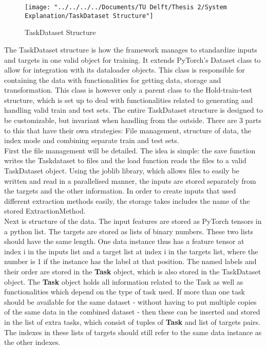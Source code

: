 \begin{figure}
	\centering
	\texttt{[image: "../../../../Documents/TU Delft/Thesis 2/System Explanation/TaskDataset Structure"]}
	\caption[TaskDataset Structure]{TaskDataset Structure}
	\label{fig:taskdataset-structure}
\end{figure}

The TaskDataset structure is how the framework manages to standardize inputs and targets in one valid object for training. It extends PyTorch's Dataset class to allow for integration with its dataloader objects. This class is responsible for containing the data with functionalities for getting data, storage and transformation. This class is however only a parent class to the Hold-train-test structure, which is set up to deal with functionalities related to generating and handling valid train and test sets. The entire TaskDataset structure is designed to be customizable, but invariant when handling from the outside. There are 3 parts to this that have their own strategies: File management, structure of data, the index mode and combining separate train and test sets. \\

First the file management will be detailed. The idea is simple: the save function writes the Taskdataset to files and the load function reads the files to a valid TaskDataset object. Using the joblib library, which allows files to easily be written and read in a parallelised manner, the inputs are stored separately from the targets and the other information. In order to create inputs that used different extraction methods easily, the storage takes includes the name of the stored ExtractionMethod. \\

Next is structure of the data. The input features are stored as PyTorch tensors in a python list. The targets are stored as lists of binary numbers. These two lists should have the same length. One data instance thus has a feature tensor at index i in the inputs list and a target list at index i in the targets list, where the number is 1 if the instance has the label at that position. The named labels and their order are stored in the \textbf{Task} object, which is also stored in the TaskDataset object. The \textbf{Task} object holds all information related to the Task as well as functionalities which depend on the type of task used. If more than one task should be available for the same dataset - without having to put multiple copies of the same data in the combined dataset - then these can be inserted and stored in the list of extra tasks, which consist of tuples of \textbf{Task} and list of targets pairs. The indexes in these lists of targets should still refer to the same data instance as the other indexes. \\

